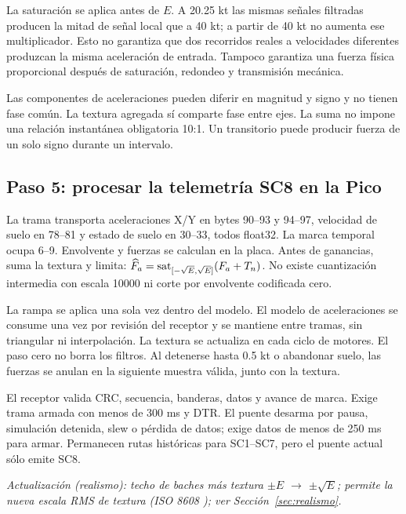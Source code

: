 La saturación se aplica antes de $E$. A 20.25 kt las mismas señales filtradas producen la mitad de señal local que a 40 kt; a partir de 40 kt no aumenta ese multiplicador. Esto no garantiza que dos recorridos reales a velocidades diferentes produzcan la misma aceleración de entrada. Tampoco garantiza una fuerza física proporcional después de saturación, redondeo y transmisión mecánica.

Las componentes de aceleraciones pueden diferir en magnitud y signo y no tienen fase común. La textura agregada sí comparte fase entre ejes. La suma no impone una relación instantánea obligatoria 10:1. Un transitorio puede producir fuerza de un solo signo durante un intervalo.

\subsection{Paso 5: procesar la telemetría SC8 en la Pico}
La trama transporta aceleraciones X/Y en bytes 90--93 y 94--97, velocidad de suelo en 78--81 y estado de suelo en 30--33, todos float32. La marca temporal ocupa 6--9. Envolvente y fuerzas se calculan en la placa. Antes de ganancias,  suma la textura y limita: $\widehat F_a=\operatorname{sat}_{[-\sqrt E,\sqrt E]}(F_a+T_n)$. No existe cuantización intermedia con escala 10000 ni corte por envolvente codificada cero.

La rampa se aplica una sola vez dentro del modelo. El modelo de aceleraciones se consume una vez por revisión del receptor y se mantiene entre tramas, sin triangular ni interpolación. La textura se actualiza en cada ciclo de motores. El paso cero no borra los filtros. Al detenerse hasta 0.5 kt o abandonar suelo, las fuerzas se anulan en la siguiente muestra válida, junto con la textura.

El receptor valida CRC, secuencia, banderas, datos y avance de marca. Exige trama armada con menos de 300 ms y DTR. El puente desarma por pausa, simulación detenida, slew o pérdida de datos; exige datos de menos de 250 ms para armar. Permanecen rutas históricas para SC1--SC7, pero el puente actual sólo emite SC8.

\textit{Actualización (realismo): techo de baches más textura $\pm E$ $\rightarrow$ $\pm\sqrt E$; permite la nueva escala RMS de textura (ISO 8608 \cite{iso8608}); ver Sección~\ref{sec:realismo}.}

